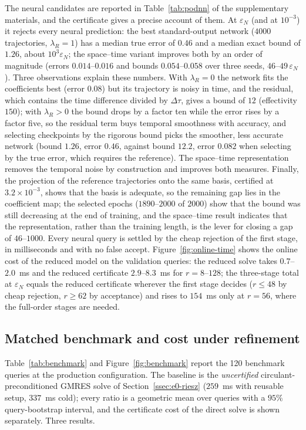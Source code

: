 \documentclass[hidelinks]{siamart251216}
\newcommand{\dt}{\Delta\tau}
\begin{document}
The neural candidates are reported in Table~\ref{tab:podnn} of the supplementary materials, and
the certificate gives a precise account of them.  At $\varepsilon_N$ (and at $10^{-3}$) it rejects
every neural prediction: the best standard-output network ($4000$ trajectories, $\lambda_R=1$) has a
median true error of $0.46$ and a median exact bound of $1.26$, about $10^3\varepsilon_N$; the
space--time variant improves both by an order of magnitude (errors $0.014$--$0.016$ and bounds
$0.054$--$0.058$ over three seeds, $46$--$49\,\varepsilon_N$).  Three observations explain these
numbers.  With $\lambda_R=0$ the network fits the coefficients best (error $0.08$) but its trajectory
is noisy in time, and the residual, which contains the time difference divided by $\dt$, gives a
bound of $12$ (effectivity $150$); with $\lambda_R>0$ the bound drops by a factor ten while the error
rises by a factor five, so the residual term buys temporal smoothness with accuracy, and selecting
checkpoints by the rigorous bound picks the smoother, less accurate network (bound $1.26$, error
$0.46$, against bound $12.2$, error $0.082$ when selecting by the true error, which requires the
reference).  The space--time representation removes the temporal noise by construction and
improves both measures.  Finally, the projection of the reference trajectories onto the same basis,
certified at $3.2\times10^{-3}$, shows that the basis is adequate, so the remaining gap lies in the
coefficient map; the selected epochs ($1890$--$2000$ of $2000$) show that the bound was still
decreasing at the end of training, and the space--time result indicates that the representation,
rather than the training length, is the lever for closing a gap of $46$--$1000$.  Every neural query is
settled by the cheap rejection of the first stage, in milliseconds and with no false accept.  Figure~\ref{fig:online-time} shows the online cost of the
reduced model on the validation queries: the reduced solve takes $0.7$--$2.0$~ms and the reduced
certificate $2.9$--$8.3$~ms for $r=8$--$128$; the three-stage total at $\varepsilon_N$ equals the
reduced certificate wherever the first stage decides ($r\le48$ by cheap rejection, $r\ge62$ by
acceptance) and rises to $154$~ms only at $r=56$, where the full-order stages are needed.
\subsection{Matched benchmark and cost under refinement}
\label{ssec:benchmark}\label{ssec:scaling-results}
Table~\ref{tab:benchmark} and Figure~\ref{fig:benchmark} report the 120 benchmark queries at the
production configuration.  The baseline is the \emph{uncertified} circulant-preconditioned GMRES
solve of Section~\ref{ssec:e0-riesz} ($259$~ms with reusable setup, $337$~ms cold); every ratio is a
geometric mean over queries with a $95\%$ query-bootstrap interval, and the certificate cost of the
direct solve is shown separately.  Three results.
\end{document}
